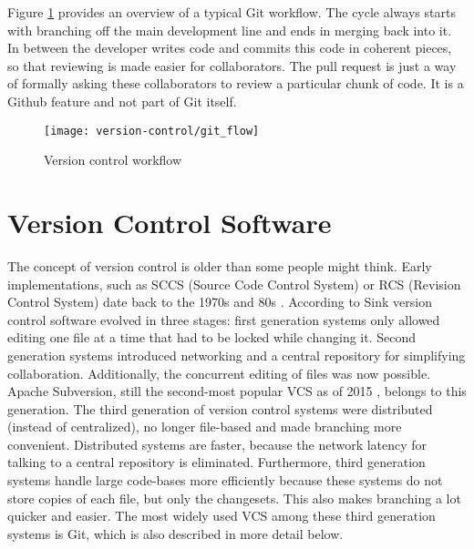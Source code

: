 Figure \ref{fig:git-workflow} provides an overview of a typical Git workflow. The cycle always starts with branching off the main development line and ends in merging back into it. In between the developer writes code and commits this code in coherent pieces, so that reviewing is made easier for collaborators. The pull request is just a way of formally asking these collaborators to review a particular chunk of code. It is a Github feature and not part of Git itself.


\begin{figure}[h]
 \centering
 \texttt{[image: version-control/git\_flow]}
 \caption{Version control workflow}
 \label{fig:git-workflow}
\end{figure}


\section{Version Control Software}
The concept of version control is older than some people might think. Early implementations, such as SCCS (Source Code Control System) or RCS (Revision Control System) date back to the 1970s and 80s \cite{_gnu_????} \cite{rochkind_source_1975}. According to Sink \cite{sink_version_2011} version control software evolved in three stages: first generation systems only allowed editing one file at a time that had to be locked while changing it. Second generation systems introduced networking and a central repository for simplifying collaboration. Additionally, the concurrent editing of files was now possible. Apache Subversion, still the second-most popular VCS as of 2015 \cite{_stack_2015}, belongs to this generation. The third generation of version control systems were distributed (instead of centralized), no longer file-based and made branching more convenient. Distributed systems are faster, because the network latency for talking to a central repository is eliminated. Furthermore, third generation systems handle large code-bases more efficiently because these systems do not store copies of each file, but only the changesets. This also makes branching a lot quicker and easier. The most widely used VCS among these third generation systems is Git, which is also described in more detail below.

